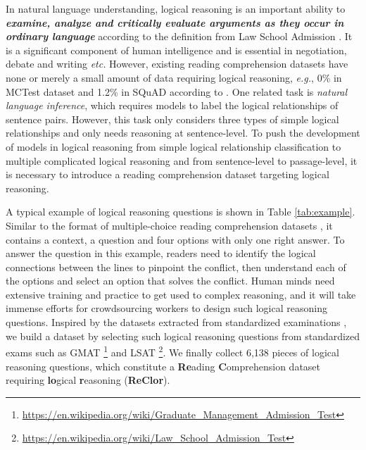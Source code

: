 \documentclass{article} \usepackage{iclr2020_conference,times}
\begin{document}
	
In natural language understanding, logical reasoning is an important ability to \textbf{\textit{examine, analyze and critically evaluate arguments as they occur in ordinary language}} according to the definition from Law School Admission \citet{lsac19logical}. It is a significant component of human intelligence and is essential in negotiation, debate and writing \textit{etc.} However, existing reading comprehension datasets have none or merely a small amount of data requiring logical reasoning, \textit{e.g.}, 0\% in MCTest dataset \citep{richardson2013mctest} and 1.2\% in SQuAD \citep{rajpurkar2016squad} according to   \citet{sugawara2016analysis}. One related task is \textit{natural language inference}, which requires models to label the logical relationships of sentence pairs. However, this task only considers three types of simple logical relationships and only needs reasoning at sentence-level. To push the development of models in logical reasoning from simple logical relationship classification to multiple complicated logical reasoning and from sentence-level to passage-level, it is necessary to introduce a reading comprehension dataset targeting logical reasoning. 
	
 
A typical example of logical reasoning questions is shown in Table \ref{tab:example}. Similar to the format of multiple-choice reading comprehension datasets \citep{richardson2013mctest, lai2017race}, it contains a context, a question and four options with only one right answer. To answer the question in this example, readers need to identify the logical connections between the lines to pinpoint the conflict, then understand each of the options and select an option that solves the conflict. Human minds need extensive training and practice to get used to complex reasoning, and it will take immense efforts for crowdsourcing workers to design such logical reasoning questions. Inspired by the datasets extracted from standardized examinations \citep{lai2017race, clark2018think}, we build a dataset by selecting such logical reasoning questions from standardized exams such as GMAT \footnote{\url{https://en.wikipedia.org/wiki/Graduate_Management_Admission_Test}} and LSAT \footnote{\url{https://en.wikipedia.org/wiki/Law\_School\_Admission\_Test}}. We  finally collect 6,138 pieces of logical reasoning questions, which constitute a \textbf{Re}ading \textbf{C}omprehension dataset requiring \textbf{lo}gical \textbf{r}easoning (\textbf{ReClor}). 
	
\end{document}
